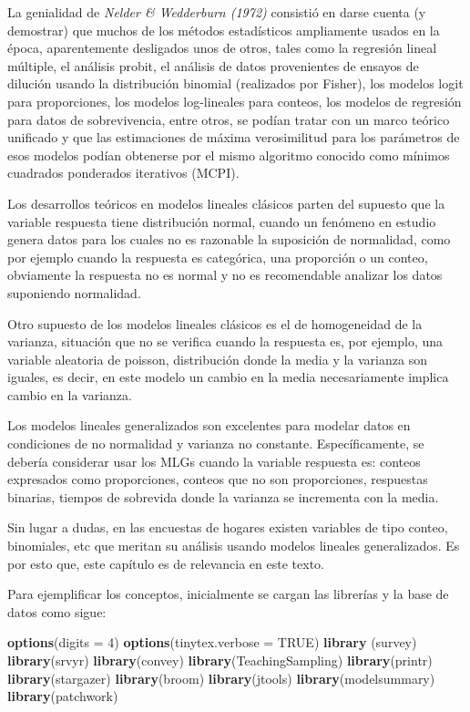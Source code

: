 \documentclass[
  spanish,
  12pt,
]{book}
\newenvironment{Shaded}{\begin{snugshade}}{\end{snugshade}}
\newcommand{\AttributeTok}[1]{\textcolor[rgb]{0.13,0.29,0.53}{#1}}
\newcommand{\ConstantTok}[1]{\textcolor[rgb]{0.56,0.35,0.01}{#1}}
\newcommand{\DecValTok}[1]{\textcolor[rgb]{0.00,0.00,0.81}{#1}}
\newcommand{\FunctionTok}[1]{\textcolor[rgb]{0.13,0.29,0.53}{\textbf{#1}}}
\newcommand{\NormalTok}[1]{#1}
\begin{document}
La genialidad de \emph{Nelder \& Wedderburn (1972)} consistió en darse cuenta (y demostrar) que muchos de los métodos estadísticos ampliamente usados en la época, aparentemente desligados unos de otros, tales como la regresión lineal múltiple, el análisis probit, el análisis de datos provenientes de ensayos de dilución usando la distribución binomial (realizados por Fisher), los modelos logit para proporciones, los modelos log-lineales para conteos, los modelos de regresión para datos de sobrevivencia, entre otros, se podían tratar con un marco teórico unificado y que las estimaciones de máxima verosimilitud para los parámetros de esos modelos podían obtenerse por el mismo algoritmo conocido como mínimos cuadrados ponderados iterativos (MCPI).

Los desarrollos teóricos en modelos lineales clásicos parten del supuesto que la variable respuesta tiene distribución normal, cuando un fenómeno en estudio genera datos para los cuales no es razonable la suposición de normalidad, como por ejemplo cuando la respuesta es categórica, una proporción o un conteo, obviamente la respuesta no es normal y no es recomendable analizar los datos suponiendo normalidad.

Otro supuesto de los modelos lineales clásicos es el de homogeneidad de la varianza, situación que no se verifica cuando la respuesta
es, por ejemplo, una variable aleatoria de poisson, distribución donde la media y la varianza son iguales, es decir, en este modelo un cambio en la media necesariamente implica cambio en la varianza.

Los modelos lineales generalizados son excelentes para modelar datos en condiciones de no normalidad y varianza no constante. Específicamente, se debería considerar usar los MLGs cuando la variable respuesta es: conteos expresados como proporciones, conteos que no son proporciones, respuestas binarias, tiempos de sobrevida donde la varianza se incrementa con la media.

Sin lugar a dudas, en las encuestas de hogares existen variables de tipo conteo, binomiales, etc que meritan su análisis usando modelos lineales generalizados. Es por esto que, este capítulo es de relevancia en este texto.

Para ejemplificar los conceptos, inicialmente se cargan las librerías y la base de datos como sigue:

\begin{Shaded}
\begin{Highlighting}[]
\FunctionTok{options}\NormalTok{(}\AttributeTok{digits =} \DecValTok{4}\NormalTok{)}
\FunctionTok{options}\NormalTok{(}\AttributeTok{tinytex.verbose =} \ConstantTok{TRUE}\NormalTok{)}
\FunctionTok{library}\NormalTok{ (survey)}
\FunctionTok{library}\NormalTok{(srvyr)}
\FunctionTok{library}\NormalTok{(convey)}
\FunctionTok{library}\NormalTok{(TeachingSampling)}
\FunctionTok{library}\NormalTok{(printr)}
\FunctionTok{library}\NormalTok{(stargazer)}
\FunctionTok{library}\NormalTok{(broom)}
\FunctionTok{library}\NormalTok{(jtools)}
\FunctionTok{library}\NormalTok{(modelsummary)}
\FunctionTok{library}\NormalTok{(patchwork)}
\end{Highlighting}
\end{Shaded}
\end{document}
